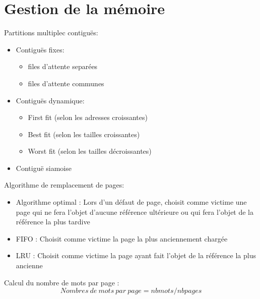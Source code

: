 \documentclass[11pt,a4paper,oneside,french,svgnames]{report}
\begin{document}
\section*{Gestion de la mémoire}
Partitions  multiplec contiguës:
\begin{itemize}
\item Contiguës fixes:
\begin{itemize}
\item files d'attente separées
\item files d'attente communes
\end{itemize}
\item Contiguës dynamique:
\begin{itemize}
\item First fit (selon les adresses croissantes)
\item Best fit (selon les tailles croissantes)
\item Worst fit (selon les tailles décroissantes)
\end{itemize}
\item Contiguë siamoise
\end{itemize}

Algorithme de remplacement de pages:
\begin{itemize}
\item Algorithme optimal : Lors d'un défaut de page, choisit comme victime une page qui ne fera l'objet d'aucune référence ultérieure  ou qui fera l'objet de la référence la plus tardive
\item FIFO : Choisit comme victime la page la plus anciennement chargée
\item LRU  : Choisit comme victime la page ayant fait l'objet de la référence la plus ancienne
\end{itemize}

Calcul du nombre de mots par page :
\begin{equation}
Nombres~de~mots~par~page = nbmots / nbpages
\end{equation}
\end{document}
